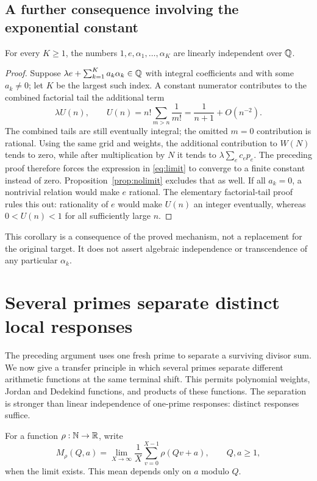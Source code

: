 \subsection{A further consequence involving the exponential constant}
\begin{corollary}\label{cor:e}
For every $K\geq1$, the numbers
$1,e,\alpha_1,\ldots,\alpha_K$ are linearly independent over $\mathbb Q$.
\end{corollary}
\begin{proof}
Suppose $\lambda e+\sum_{k=1}^{K}a_k\alpha_k\in\mathbb Q$ with integral
coefficients and with some $a_k\ne0$; let $K$ be the largest such
index. A constant numerator contributes to the combined factorial
tail the additional term
\[
 \lambda U(n),\qquad
 U(n)=n!\sum_{m>n}\frac1{m!}
     =\frac1{n+1}+O(n^{-2}).
\]
The combined tails are still eventually integral; the omitted
$m=0$ contribution is rational. Using the same grid and weights,
the additional contribution to $W(N)$ tends to zero, while after
multiplication by $N$ it tends to $\lambda\sum_ec_ep_e$.
The preceding proof therefore forces the expression in
\eqref{eq:limit} to converge to a finite constant instead of zero.
Proposition~\ref{prop:nolimit} excludes that as well.
If all $a_k=0$, a nontrivial relation would make $e$ rational.
The elementary factorial-tail proof rules this out: rationality of
$e$ would make $U(n)$ an integer eventually, whereas $0<U(n)<1$
for all sufficiently large $n$.
\end{proof}

This corollary is a consequence of the proved mechanism, not a
replacement for the original target. It does not assert algebraic
independence or transcendence of any particular $\alpha_k$.

\section{Several primes separate distinct local responses}\label{sec:transfer}
The preceding argument uses one fresh prime to separate a surviving
divisor sum. We now give a transfer principle in which several primes
separate different arithmetic functions at the same terminal shift.
This permits polynomial weights, Jordan and Dedekind functions, and
products of these functions. The separation is stronger than linear
independence of one-prime responses: distinct responses suffice.

For a function $\rho:\mathbb N\to\mathbb R$, write
\[
 M_\rho(Q,a)=\lim_{X\to\infty}\frac1X
        \sum_{v=0}^{X-1}\rho(Qv+a),\qquad Q,a\geq1,
\]
when the limit exists. This mean depends only on $a$ modulo $Q$.

